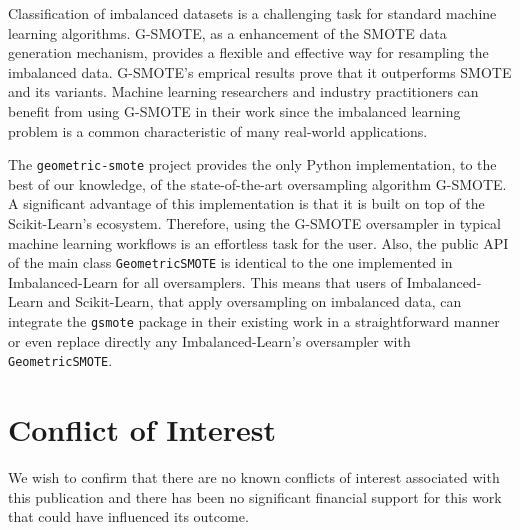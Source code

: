 \documentclass[preprint,12pt, a4paper]{elsarticle}
\begin{document}
Classification of imbalanced datasets is a challenging task for standard machine learning algorithms. G-SMOTE, as a enhancement of the SMOTE data generation mechanism, provides a flexible and effective way for resampling the imbalanced data. G-SMOTE's emprical results prove that it outperforms SMOTE and its variants. Machine learning researchers and industry practitioners can benefit from using G-SMOTE in their work since the imbalanced learning problem is a common characteristic of many real-world applications.

The \texttt{geometric-smote} project provides the only Python implementation, to the best of our knowledge, of the state-of-the-art oversampling algorithm G-SMOTE. A significant advantage of this implementation is that it is built on top of the Scikit-Learn's ecosystem. Therefore, using the G-SMOTE oversampler in typical machine learning workflows is an effortless task for the user. Also, the public API of the main class \texttt{GeometricSMOTE} is identical to the one implemented in Imbalanced-Learn for all oversamplers. This means that users of Imbalanced-Learn and Scikit-Learn, that apply oversampling on imbalanced data, can integrate the \texttt{gsmote} package in their existing work in a straightforward manner or even replace directly any Imbalanced-Learn's oversampler with \texttt{GeometricSMOTE}.

\section{Conflict of Interest}

We wish to confirm that there are no known conflicts of interest associated with this publication and there has been no significant financial support for this work that could have influenced its outcome.



\end{document}
